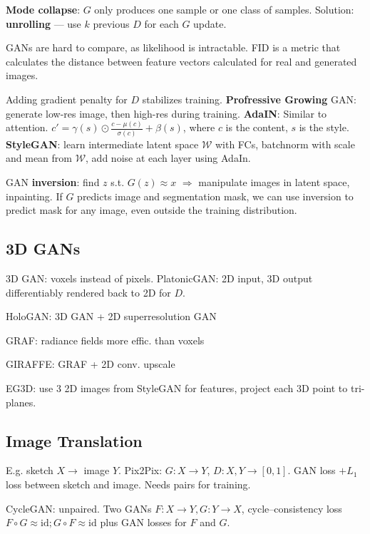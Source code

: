 \documentclass[11pt,landscape,a4paper,fleqn]{article}
\begin{document}
\begin{multicols*}{4}
\textbf{Mode collapse}: $G$ only produces one sample or one class of samples.
Solution: \textbf{unrolling} --- use $k$ previous $D$ for each $G$ update.

GANs are hard to compare, as likelihood is intractable.
FID is a metric that calculates the distance between feature vectors
calculated for real and generated images.


Adding gradient penalty for $D$ stabilizes training.
\textbf{Profressive Growing} GAN: generate low-res image, then high-res during training.
\textbf{AdaIN}: Similar to attention. $c' = \gamma(s) \odot \frac{c - \mu (c)}{\sigma(c)} + \beta(s)$, where $c$ is the content, $s$ is the style.
\textbf{StyleGAN}: learn intermediate latent space $\mathcal{W}$ with FCs,
batchnorm with scale and mean from $\mathcal{W}$, add noise at each layer using AdaIn.

GAN \textbf{inversion}: find $z$ s.t. $G(z) \approx x$ $ \Rightarrow $ manipulate images in latent space, inpainting.
If $G$ predicts image and segmentation mask,
we can use inversion to predict mask for any image, even outside the training distribution.

\subsection{3D GANs}

3D GAN: voxels instead of pixels.
PlatonicGAN: 2D input, 3D output differentiably rendered back to 2D for $D$.

HoloGAN: 3D GAN + 2D superresolution GAN

GRAF: radiance fields more effic. than voxels

GIRAFFE: GRAF + 2D conv. upscale

EG3D: use 3 2D images from StyleGAN for features, project each 3D point to tri-planes.

\subsection{Image Translation}

E.g. sketch $X \to$ image $Y$.
Pix2Pix:
$G : X \to Y$,
$D : X, Y \to [0, 1]$.
GAN loss $+ L_1$ loss between sketch and image.
Needs pairs for training.

CycleGAN: unpaired.
Two GANs $F: X \to Y, G : Y \to X$,
cycle--consistency loss $F \circ G \approx \mathrm{id}; G \circ F \approx \mathrm{id}$
plus GAN losses for $F$ and $G$.


\end{multicols*}
\end{document}
